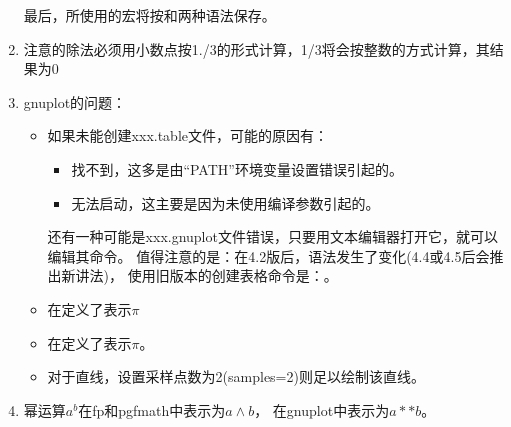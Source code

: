 \documentclass[../main.tex]{subfiles}
\begin{document}
\begin{enumerate}
最后，所使用的宏将按和两种语法保存。

\item 注意的除法必须用小数点按1./3的形式计算，1/3将会按整数的方式计算，其结果为0
\item gnuplot的问题：
  \begin{itemize}
   \item 如果未能创建xxx.table文件，可能的原因有：
     \begin{itemize}
		 \item  \TEX{}找不到，这多是由\enquote{PATH}环境变量设置错误引起的。
		 \item  \TEX{}无法启动，这主要是因为未使用编译参数引起的。
    \end{itemize}

还有一种可能是xxx.gnuplot文件错误，只要用文本编辑器打开它，就可以编辑其命令。
值得注意的是：在4.2版后，语法发生了变化(4.4或4.5后会推出新讲法)，
使用旧版本的创建表格命令是：。


   \item 在定义了表示$\pi$
   \item 在定义了表示$\pi$。
   \item 对于直线，设置采样点数为2(samples=2)则足以绘制该直线。
  \end{itemize}

 \item 幂运算$a^b$在fp和pgfmath中表示为$a \wedge b$，
	 在gnuplot中表示为$a**b$。


\end{enumerate}
\end{document}
